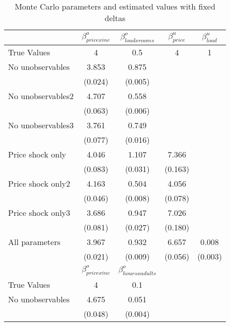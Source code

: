 \begin{table}[!ht]
	\centering
		\caption{Monte Carlo parameters and estimated values with fixed deltas}
\begin{tabular}{lcccc}
		\toprule
               &     $\beta^o_{price x inc}$ & $\beta^o_{load x rooms}$ & $\beta^u_{price}$ & $\beta^u_{load}$ \\
		\midrule
		True Values&   4&  0.5 & 4 & 1 \\
		No unobservables &     3.853& 0.875 & & \\
		& (0.024) & (0.005) & & \\
		No unobservables2 & 4.707 & 0.558 & & \\
		& (0.063) & (0.006) & & \\
		No unobservables3 & 3.761 & 0.749& & \\
		& (0.077) & (0.016) & & \\
		Price shock only & 4.046 & 1.107 & 7.366 \\
		& (0.083) & (0.031) & (0.163) \\
		Price shock only2 & 4.163 & 0.504 & 4.056 \\
		& (0.046) & (0.008) & (0.078) \\
		Price shock only3 & 3.686 & 0.947 & 7.026 \\
		& (0.081) & (0.027) & (0.180) \\
		All parameters&     3.967 & 0.932 & 6.657 & 0.008 \\
		& (0.021) & (0.009)& (0.056) & (0.003) \\
		\midrule 
		&     $\beta^o_{price x inc}$ & $\beta^o_{hours x adults}$ &  &  \\
		\midrule
		True Values & 4 & 0.1 & &  \\
		No unobservables & 4.675 & 0.051 & & \\
		 & (0.048) & (0.004) & & \\
		\bottomrule
	\end{tabular}
\end{table}